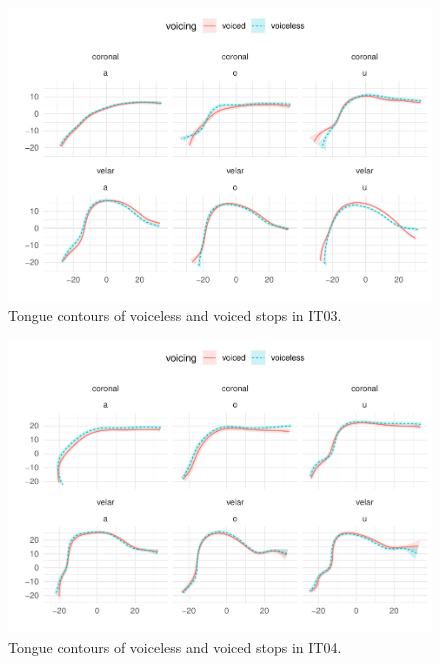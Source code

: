 \documentclass[11pt,]{article}
\begin{document}
\begin{figure}

{\centering \includegraphics[width=.8\textwidth]{2018-polar-gam_files/figure-latex/Figure09} 

}

\caption{Tongue contours of voiceless and voiced stops in IT03.}\label{f:Figure09}
\end{figure}

\begin{figure}

{\centering \includegraphics[width=.8\textwidth]{2018-polar-gam_files/figure-latex/Figure10} 

}

\caption{Tongue contours of voiceless and voiced stops in IT04.}\label{f:Figure10}
\end{figure}
\end{document}
